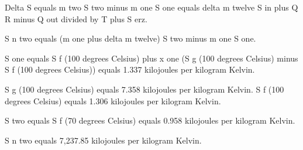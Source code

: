 Delta S equals m two S two minus m one S one equals delta m twelve S in plus Q R minus Q out divided by T plus S erz.  

S n two equals (m one plus delta m twelve) S two minus m one S one.  

S one equals S f (100 degrees Celsius) plus x one (S g (100 degrees Celsius) minus S f (100 degrees Celsius)) equals 1.337 kilojoules per kilogram Kelvin.  

S g (100 degrees Celsius) equals 7.358 kilojoules per kilogram Kelvin.  
S f (100 degrees Celsius) equals 1.306 kilojoules per kilogram Kelvin.  

S two equals S f (70 degrees Celsius) equals 0.958 kilojoules per kilogram Kelvin.  

S n two equals 7,237.85 kilojoules per kilogram Kelvin.